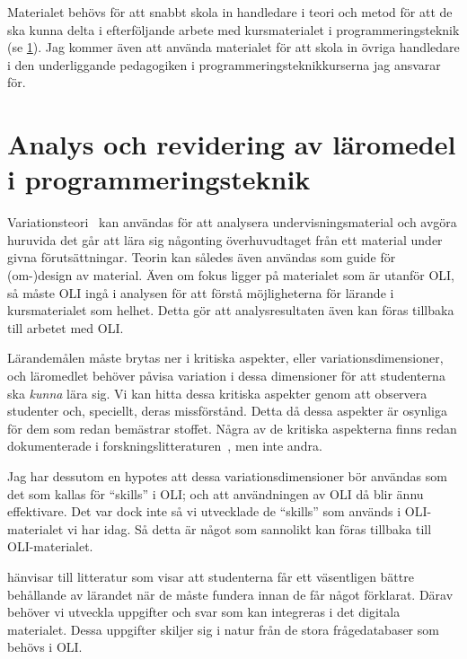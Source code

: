 \documentclass[a4paper,swedish]{article}
\begin{document}
Materialet behövs för att snabbt skola in handledare i teori och metod för att 
de ska kunna delta i efterföljande arbete med kursmaterialet i 
programmeringsteknik (se \cref{analys}). Jag kommer även att använda materialet 
för att skola in övriga handledare i den underliggande pedagogiken i 
programmeringsteknikkurserna jag ansvarar för.


\section{Analys och revidering av läromedel i programmeringsteknik}%
\label{analys}

Variationsteori~\parencite[kap.~3]{NecessaryConditionsOfLearning} kan användas 
för att analysera undervisningsmaterial och avgöra huruvida det går att lära 
sig någonting överhuvudtaget från ett material under givna förutsättningar. 
Teorin kan således även användas som guide för (om-)design av material.
Även om fokus ligger på materialet som är utanför OLI, så måste OLI ingå i 
analysen för att förstå möjligheterna för lärande i kursmaterialet som helhet. 
Detta gör att analysresultaten även kan föras tillbaka till arbetet med OLI.

Lärandemålen måste brytas ner i kritiska aspekter, eller variationsdimensioner, 
och läromedlet behöver påvisa variation i dessa dimensioner för att 
studenterna ska \emph{kunna} lära sig.
Vi kan hitta dessa kritiska aspekter genom att observera studenter och, 
speciellt, deras missförstånd.
Detta då dessa aspekter är osynliga för dem som redan bemästrar stoffet.
Några av de kritiska aspekterna finns redan dokumenterade i 
forskningslitteraturen~\parencite[exempelvis][]{VariationTheoryInProgramming}, 
men inte andra.

Jag har dessutom en hypotes att dessa variationsdimensioner bör användas som 
det som kallas för \enquote{skills} i OLI; och att användningen av OLI då blir 
ännu effektivare.
Det var dock inte så vi utvecklade de \enquote{skills} som används i 
OLI-materialet vi har idag.
Så detta är något som sannolikt kan föras tillbaka till OLI-materialet.

\Textcite{NecessaryConditionsOfLearning} hänvisar till litteratur som visar att 
studenterna får ett väsentligen bättre behållande av lärandet när de måste 
fundera innan de får något förklarat.
Därav behöver vi utveckla uppgifter och svar som kan integreras i det digitala 
materialet.
Dessa uppgifter skiljer sig i natur från de stora frågedatabaser som behövs i 
OLI.
\end{document}
